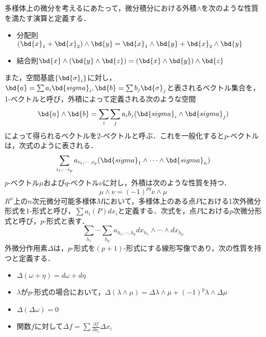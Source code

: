 		多様体上の微分を考えるにあたって，微分積分における外積$ \wedge $を次のような性質を満たす演算と定義する．
		\begin{itemize}
			\item 分配則$ (\bd{x}_1 + \bd{x}_2) \wedge \bd{y} = \bd{x}_1 \wedge \bd{y} + \bd{x}_2 \wedge \bd{y} $
			\item 結合則$ \bd{x} \wedge (\bd{y} \wedge \bd{z}) = (\bd{x} \wedge \bd{y} )\wedge \bd{z}$
		\end{itemize}
		また，空間基底$ \{ \bd{\sigma}_i \} $に対し，$ \bd{a} = \sum a_i \bd{sigma}_i,\bd{b} = \sum b_j \bd{\sigma}_j$と表されるベクトル集合を，1-ベクトルと呼び，外積によって定義される次のような空間
		\begin{equation}\label{eq:Gaiseki}
			\bd{a} \wedge \bd{b} = \sum_i \sum_j a_i b_j (\bd{sigma}_i \wedge \bd{sigma}_j)
		\end{equation}
		によって得られるベクトルを2-ベクトルと呼ぶ．これを一般化すると$p$-ベクトルは，次式のように表される．
		\begin{equation}\label{eq:Gaiseki2}
			\sum_{i_1,\cdots i_p} a_{i_1,\cdots,i_p} (\bd{sigma}_1 \wedge \cdots \wedge \bd{sigma}_n)
		\end{equation}
		$ p $-ベクトル$ \mu $および$ q $-ベクトル$ \nu $に対し，外積は次のような性質を持つ．
		\begin{equation}\label{eq:Gaiseki3}
			\mu \wedge \nu = (-1)^{pq} \nu \wedge \mu
		\end{equation}
		$ R^n $上の$ n $次元微分可能多様体$ M $において，多様体上のある点$ P $における1次外微分形式を1-形式と呼び，$ \sum a_i(P)dx_i $と定義する．次式を，点$ P $における$ p $次微分形式と呼び，$ p $-形式と表す．
		\begin{equation}\label{eq:BIBUN1}
			\sum_{h_1} \cdots \sum_{h_p} a_{h_1,\cdots,h_p} dx_{h_1} \wedge \cdots \wedge dx_{h_p}
		\end{equation}
		外微分作用素$ \Delta $は，$p$-形式を$ (p+1) $-形式にする線形写像であり，次の性質を持つと定義する．
		\begin{itemize}
			\item $ \Delta(\omega + \eta) = d\omega + d\eta $ 
			\item $ \lambda $が$ p $-形式の場合において，$ \Delta(\lambda \wedge \mu ) = \Delta \lambda \wedge \mu + (-1)^p \lambda \wedge \Delta \mu $
			\item $ \Delta (\Delta \omega) = 0 $
			\item 関数$ f $に対して$ \Delta f = \sum \frac{\partial f}{\partial x_i }\Delta x_i $
		\end{itemize}
